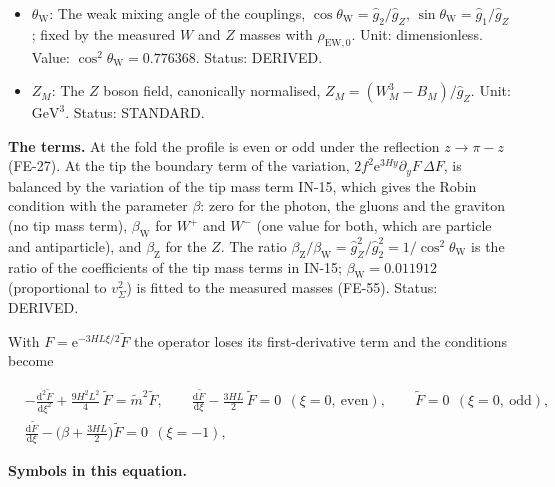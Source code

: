 \documentclass[
  10pt,
]{article}
\begin{document}
\begin{itemize}
  \(\beta_{\mathrm{Z}} = \beta_{\mathrm{W}}/\cos^2\theta_{\mathrm{W}}\).
  Unit: dimensionless. Value: 0.015343. Status: DERIVED.
\item
  \(\theta_{\mathrm{W}}\): The weak mixing angle of the couplings,
  \(\cos\theta_{\mathrm{W}} = \hat g_2/\hat g_Z\),
  \(\sin\theta_{\mathrm{W}} = \hat g_1/\hat g_Z\); fixed by the measured
  \(W\) and \(Z\) masses with \(\rho_{\mathrm{EW},0}\). Unit:
  dimensionless. Value: \(\cos^2\theta_{\mathrm{W}} = 0.776368\).
  Status: DERIVED.
\item
  \(Z_M\): The \(Z\) boson field, canonically normalised,
  \(Z_M = (W^3_M - B_M)/\hat g_Z\). Unit: \(\mathrm{GeV}^{3}\). Status:
  STANDARD.
\end{itemize}

\textbf{The terms.} At the fold the profile is even or odd under the
reflection \(z \to \pi - z\) (FE-27). At the tip the boundary term of
the variation, \(2f^2\mathrm{e}^{3Hy}\partial_yF\,\Delta F\), is
balanced by the variation of the tip mass term IN-15, which gives the
Robin condition with the parameter \(\beta\): zero for the photon, the
gluons and the graviton (no tip mass term), \(\beta_{\mathrm{W}}\) for
\(W^+\) and \(W^-\) (one value for both, which are particle and
antiparticle), and \(\beta_{\mathrm{Z}}\) for the \(Z\). The ratio
\(\beta_{\mathrm{Z}}/\beta_{\mathrm{W}} = \hat g_Z^2/\hat g_2^2 = 1/\cos^2\theta_{\mathrm{W}}\)
is the ratio of the coefficients of the tip mass terms in IN-15;
\(\beta_{\mathrm{W}} = 0.011912\) (proportional to \(v_\Sigma^2\)) is
fitted to the measured masses (FE-55). Status: DERIVED.

With \(F = \mathrm{e}^{-3HL\xi/2}\tilde F\) the operator loses its
first-derivative term and the conditions become

\[
\begin{aligned}
&-\frac{\mathrm{d}^2\tilde F}{\mathrm{d}\xi^2} + \frac{9H^2L^2}{4}\,\tilde F = \tilde m^2\tilde F,\qquad
 \frac{\mathrm{d}\tilde F}{\mathrm{d}\xi} - \frac{3HL}{2}\,\tilde F = 0\ \ (\xi = 0,\ \text{even}),\qquad
 \tilde F = 0\ \ (\xi = 0,\ \text{odd}),\\
&\frac{\mathrm{d}\tilde F}{\mathrm{d}\xi} - \Big(\beta + \frac{3HL}{2}\Big)\tilde F = 0\ \ (\xi = -1),
\end{aligned}
\]

\textbf{Symbols in this equation.}
\end{document}
